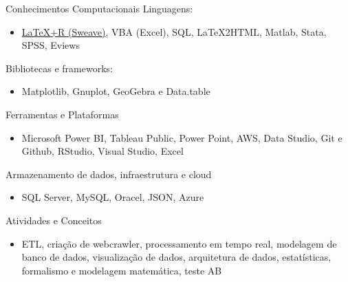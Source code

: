 \documentclass{beamer}
\begin{document}
\begin{frame}{Conhecimentos Computacionais}
\footnotesize
Linguagens:
\begin{itemize}
    \item \textcolor{blue}{\href{http://www.leg.ufpr.br/~paulojus/embrapa/Rembrapa/Rembrapase35.html}{LaTeX+R (Sweave)}}, VBA (Excel), SQL, LaTeX2HTML, Matlab, Stata, SPSS, Eviews
\end{itemize}

Bibliotecas e frameworks:
\begin{itemize}
    \item Matplotlib, Gnuplot, GeoGebra e Data.table
\end{itemize}

Ferramentas e Plataformas
\begin{itemize}
    \item Microsoft Power BI, Tableau Public, Power Point, AWS, Data Studio, Git e Github, RStudio, Visual Studio, Excel
\end{itemize}
Armazenamento de dados, infraestrutura e cloud
\begin{itemize}
    \item SQL Server, MySQL, Oracel, JSON, Azure
\end{itemize}
Atividades e Conceitos
\begin{itemize}
\item ETL, criação de webcrawler, processamento em tempo real, modelagem de banco de dados, visualização de dados, arquitetura de dados, estatísticas, formalismo e modelagem matemática, teste AB
\end{itemize}

\end{frame}


\end{document}
